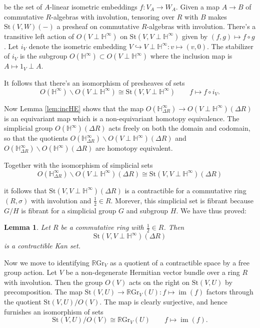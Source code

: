 \documentclass[edeposit,fullpage]{uiucthesis2009}
\newcommand{\mbb}{\mathbb}
\newcommand{\RGr}{\mathbb R\mathrm{Gr}}
\newcommand{\St}{\mathrm{St}}
\DeclareMathOperator*{\im}{im}
\theoremstyle{plain}
\newtheorem{lemma}{Lemma}
\numberwithin{lemma}{section}
\theoremstyle{definition}
\begin{document}
be the set of $A$-linear isometric embeddings $f : V_A \rightarrow
W_A$. Given a map $A \rightarrow B$ of commutative $R$-algebras with involution, tensoring over $R$ with $B$ makes
$\St(V,W)(-)$ a presheaf on commutative $R$-algebras with involution. There's a
transitive left action of $O(V \perp \mbb H^\infty)$ on $\St(V,V \perp \mbb
H^\infty)$ given by $(f,g) \mapsto f \circ g$. Let $i_V$ denote the
isometric embedding $V \hookrightarrow V \perp \mbb H^\infty : v
\mapsto (v,0)$. The stabilizer of $i_V$ is the subgroup $O(\mbb
H^\infty) \subset O(V \perp \mbb H^\infty)$ where the inclusion map is
$A \mapsto 1_V \perp A$.

It follows that there's an isomorphism of presheaves of sets 
\[
O(\mbb H^\infty)\backslash O(V \perp \mbb  H^\infty) \cong
\St(V,V\perp \mbb H^\infty) \qquad f \mapsto f \circ i_V.
\]

Now Lemma \ref{lem:incHE} shows that the map $O(\mbb H^\infty_{\Delta
  R}) \rightarrow O(V \perp \mbb H^\infty)(\Delta R)$ is an
equivariant map which is a non-equivariant homotopy equivalence. The
simplicial group $O(\mbb H^\infty)(\Delta R)$ acts freely on both the
domain and codomain, so that the quotients $O(\mbb H^\infty_{\Delta
  R})\backslash O(V \perp \mbb H^\infty)(\Delta R)$ and $O(\mbb H^\infty_{\Delta
  R})\backslash O(\mbb H^\infty)(\Delta R)$ are homotopy equivalent.

Together with the isomorphism of simplicial sets
\[
O(\mbb H^\infty_{\Delta
  R})\backslash O(V \perp \mbb H^\infty)(\Delta R) \cong \St(V,V
\perp \mbb H^\infty)(\Delta R)
\]

it follows that $\St(V,V\perp \mbb H^\infty)(\Delta R)$ is a
contractible for a commutative ring $(R,\sigma)$ with involution and
$\frac{1}{2} \in R$. Morever, this simplicial set is fibrant because
$G/H$ is fibrant for a simplicial group $G$ and subgroup $H$. We have
thus proved:

\begin{lemma}\label{lem:St_contrac}
Let $R$ be a commutative ring with $\frac{1}{2} \in R$. Then 
\[
\St(V,V\perp \mbb H^\infty)(\Delta R)
\]
is a contractible Kan set.
\end{lemma}

Now we move to identifying $\RGr_V$ as a quotient of a contractible
space by a free group action. Let $V$ be a non-degenerate Hermitian
vector bundle over a ring $R$ with involution. Then the group $O(V)$
acts on the right on $\St(V,U)$ by precomposition. The map $\St(V,U)
\rightarrow \RGr_V(U) : f \mapsto \im(f)$ factors through the quotient
$\St(V,U)/O(V)$. The map is clearly surjective, and hence furnishes an
isomorphism of sets
\[
\St(V,U)/O(V) \cong \RGr_V(U) \qquad f \mapsto \im(f).
\]
\end{document}
